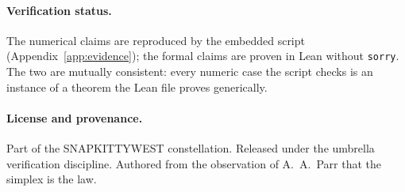\documentclass[11pt]{article}
\begin{document}
\paragraph{Verification status.} The numerical claims are reproduced by the
embedded script (Appendix~\ref{app:evidence}); the formal claims are proven in
Lean without \texttt{sorry}. The two are mutually consistent: every numeric
case the script checks is an instance of a theorem the Lean file proves
generically.

\paragraph{License and provenance.} Part of the SNAPKITTYWEST constellation.
Released under the umbrella verification discipline. Authored from the
observation of A.\ A.\ Parr that the simplex is the law.

\end{document}
